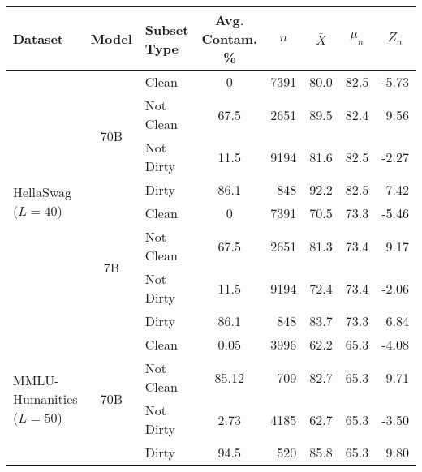 \begin{table}[]
\centering
\begin{tabular}{lclcrrrr}
\toprule
\textbf{Dataset}                         & \textbf{Model}           & \textbf{Subset Type} & \multicolumn{1}{c}{\textbf{Avg. Contam. \%}}  &\multicolumn{1}{c}{$n$} & \multicolumn{1}{c}{$\bar{X}$} & \multicolumn{1}{c}{$\mu_n$} & \multicolumn{1}{c}{$Z_n$}  \\ \midrule
\multirow{8}{*}{HellaSwag ($L=40$)}     & \multirow{4}{*}{70B} 
                                                    & Clean         &  0         & 7391  & 80.0         & 82.5    & -5.73 \\ %
                                &                      & Not Clean  &    67.5    & 2651  & 89.5      & 82.4    &  9.56 \\ %
                                &                      & Not Dirty  &    11.5    & 9194  & 81.6      & 82.5    & -2.27  \\ %
                                &                      & Dirty      &    86.1    &  848  & 92.2      & 82.5    &  7.42  \\ %
                                & \multirow{4}{*}{7B}  & Clean      &     0      & 7391  & 70.5      & 73.3    & -5.46  \\ %
                                &                      & Not Clean  &    67.5    & 2651  & 81.3      & 73.4    &  9.17  \\ %
                                &                      & Not Dirty  &    11.5    & 9194  & 72.4      & 73.4    & -2.06  \\ %
                                &                      & Dirty      &    86.1    &  848  & 83.7      & 73.3    &  6.84  \\
                                \midrule
\multirow{8}{*}{MMLU-Humanities ($L=50$)} & \multirow{4}{*}{70B}                                
                                                        & Clean     &     0.05   & 3996  & 62.2      & 65.3    & -4.08 \\ %
                                &                      & Not Clean  &    85.12   &  709  & 82.7      & 65.3    &  9.71 \\ %
                                &                      & Not Dirty  &     2.73   & 4185  & 62.7      & 65.3    & -3.50 \\ %
                                &                      & Dirty      &    94.5    &  520  & 85.8      & 65.3    &  9.80\\ %

\end{tabular}
\end{table}
